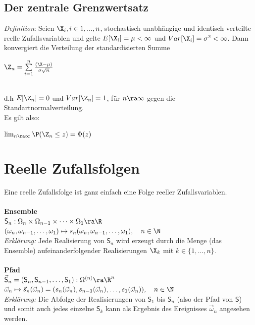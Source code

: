 \documentclass[german,color,6pt]{latex4ei/latex4ei_sheet}
\begin{document}
\begin{sectionbox}
	\subsection{Der zentrale Grenzwertsatz}
	\emph{Definition}: Seien $\X_i, i \in {1,...,n}$, stochastisch unabhängige und identisch
	verteilte reelle Zufallsvariablen und gelte $E[\X_i] = \mu < \infty$ und $Var[\X_i] = \sigma^2 < \infty$.
	Dann konvergiert die Verteilung der standardisierten Summe\\
	\centerline{$\Z_n= \sum\limits_{i=1}^{n}\frac{(\X-\mu)}{\sigma\sqrt{n}}$} \\
	d.h $E[\Z_n] = 0$ und $Var[\Z_n] = 1$, für $n \ra \infty$ gegen die Standartnormalverteilung. \\
	Es gilt also: \\
	\centerline{$\lim_{n \ra \infty} \P({\Z_n \le z}) = \Phi (z)$}
\end{sectionbox}


\vfill

\section{Reelle Zufallsfolgen}
\begin{sectionbox}
	Eine reelle Zufallsfolge ist ganz einfach eine Folge reeller Zufallsvariablen. \\ \\
	\textbf{Ensemble} \\
	$\textsf{S}_n : \Omega_n \times \Omega_{n-1} \times \dots \times \Omega_1 \ra \R$\\
	$(\omega_n,\omega_{n-1},\dots,\omega_1) \mapsto s_n(\omega_n,\omega_{n-1},\dots,\omega_1), \quad n \in \N$\\
	\emph{Erklärung:} Jede Realisierung von $\textsf{S}_n$ wird erzeugt durch die Menge (das Ensemble) aufeinanderfolgender Realisierungen $\X_k$ mit $k \in \{1,\dots,n\}$. \\ \\
	\textbf{Pfad} \\
	$\vec{\textsf{S}}_n = (\textsf{S}_n,\textsf{S}_{n-1},\dots,\textsf{S}_1) : \Omega^{(n)} \ra \R^n$\\
	$\vec{\omega}_n \mapsto \vec{s}_n(\vec{\omega}_n) = (s_n(\vec{\omega}_n),s_{n-1}(\vec{\omega}_n),\dots,s_1(\vec{\omega}_n)), \quad n \in \N$\\
	\emph{Erklärung:} Die Abfolge der Realisierungen von $\textsf{S}_1$ bis $\textsf{S}_n$ (also der Pfad von $\textsf{S}$) und somit auch jedes einzelne $\textsf{S}_k$ kann als Ergebnis des Ereignisses $\vec{\omega}_n$ angesehen werden.
\end{sectionbox}
\end{document}
